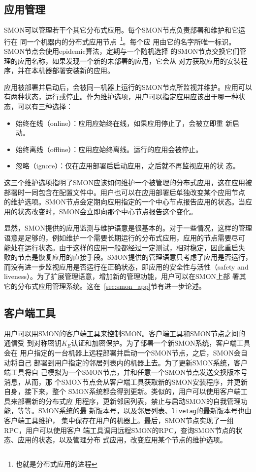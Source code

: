\subsection{应用管理}

SMON可以管理若干个其它分布式应用。每个SMON节点负责部署和维护和它运行在
同一个机器内的分布式应用节点~\footnote{也就是分布式应用的进程}。每个应
用由它的名字所唯一标识。SMON节点会使用epidemic算法，定期与一个随机选择
的SMON节点交换它们管理的应用名称，如果发现一个新的未部署的应用，它会从
对方获取应用的安装程序，并在本机器部署安装新的应用。

应用被部署并启动后，会被同一机器上运行的SMON节点所监视并维护。应用可以
有两种状态，运行或停止。作为维护选项，用户可以指定应用应该出于哪一种状
态，可以有三种选择：

\begin{itemize}
  \item 始终在线（online）：应用应始终在线，如果应用停止了，会被立即重
  新启动。

  \item 始终离线（offline）：应用应始终离线。运行的应用会被停止。

  \item 忽略（ignore）：仅在应用部署后启动应用，之后就不再监视应用的状
  态。
\end{itemize}

这三个维护选项指明了SMON应该如何维护一个被管理的分布式应用，这在应用被
部署时一同包含在配置文件中。用户也可以在应用部署后单独改变某个应用节点
的维护选项。SMON节点会定期向应用指定的一个中心节点报告应用的状态。当应
用的状态改变时，SMON会立即向那个中心节点报告这个变化。

显然，SMON提供的应用监测与维护语意是很基本的。对于一些情况，这样的管理
语意是足够的，例如维护一个需要长期运行的分布式应用，应用的节点需要尽可
能处在运行状态。由于这样的应用一般都经过一定测试，相对稳定，因此重启失
败的节点是恢复应用的直接手段。SMON提供的管理语意只考虑了应用是否运行，
而没有进一步监视应用是否运行在正确状态，即应用的安全性与活性（safety
and liveness）。为了扩展管理语意，增加新的管理功能，用户可以在SMON上部
署其它的分布式应用管理系统。这在~\ref{sec:smon_app}节有进一步论述。

\subsection{客户端工具}
\label{subsec:client}

用户可以用SMON的客户端工具来控制SMON。客户端工具和SMON节点之间的通信受
到对称密钥$K_E$认证和加密保护。为了部署一个新SMON系统，客户端工具会在
用户指定的一台机器上远程部署并启动一个SMON节点，之后，SMON会自动将自己
部署到用户指定的邻居列表内的机器上去。为了更新SMON系统，客户端工具将自
己模拟为一个SMON节点，并和任意一个SMON节点发送交换版本号消息，从而，那
个SMON节点会从客户端工具获取新的SMON安装程序，并更新自身，接下来，整个
SMON系统都会得到更新。类似的，用户可以使用客户端工具来部署新的分布式应
用程序，更新邻居列表，禁止与启动SMON的自我管理功能，等等。SMON系统的最
新版本号，以及邻居列表、\texttt{livetag}的最新版本号也由客户端工具维护，
集中保存在用户的机器上。最后，SMON节点实现了一组RPC，用户可以使用客户
端工具调用远程SMON的RPC，查询SMON节点的状态、应用的状态，以及管理分布
式应用，改变应用某个节点的维护选项。

